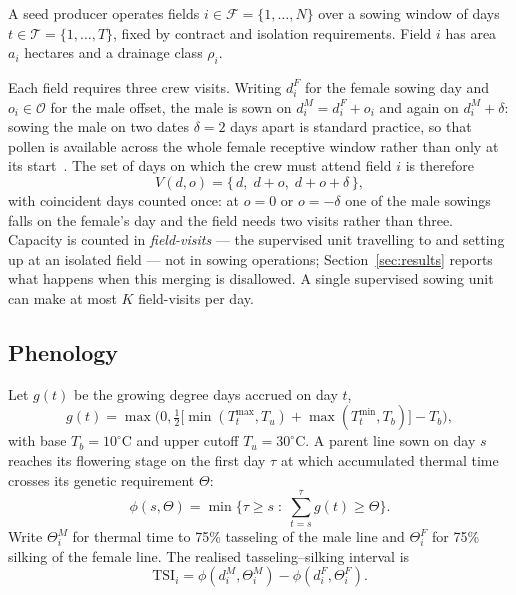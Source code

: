 \documentclass[10pt,twocolumn]{article}
\newcommand{\TSI}{\mathrm{TSI}}
\begin{document}
A seed producer operates fields $i \in \mathcal{F} = \{1,\dots,N\}$ over a
sowing window of days $t \in \mathcal{T} = \{1,\dots,T\}$, fixed by contract
and isolation requirements. Field $i$ has area $a_i$ hectares and a drainage
class $\rho_i$.

Each field requires three crew visits. Writing $d^F_i$ for the female
sowing day and $o_i \in \mathcal{O}$ for the male offset, the male is sown on
$d^M_i = d^F_i + o_i$ and again on $d^M_i + \delta$: sowing the male on two
dates $\delta = 2$ days apart is standard practice, so that pollen is
available across the whole female receptive window rather than only at its
start~\cite{chassaigne2021}. The set of days on which the crew must attend
field $i$ is therefore
\begin{equation}
V(d,o) = \{\, d,\; d+o,\; d+o+\delta \,\},
\label{eq:visits}
\end{equation}
with coincident days counted once: at $o = 0$ or $o = -\delta$ one of the
male sowings falls on the female's day and the field needs two visits
rather than three. Capacity is counted in \emph{field-visits} --- the
supervised unit travelling to and setting up at an isolated field --- not
in sowing operations; Section~\ref{sec:results} reports what happens when
this merging is disallowed. A single supervised sowing unit can make at
most $K$ field-visits per day.

\subsection{Phenology}

Let $g(t)$ be the growing degree days accrued on day $t$,
\begin{equation}
g(t) = \max\!\Big(0, \tfrac{1}{2}\big[\min(T^{\max}_t, T_u)
      + \max(T^{\min}_t, T_b)\big] - T_b\Big),
\end{equation}
with base $T_b = 10^\circ$C and upper cutoff $T_u = 30^\circ$C. A parent
line sown on day $s$ reaches its flowering stage on the first day $\tau$ at
which accumulated thermal time crosses its genetic requirement $\Theta$:
\begin{equation}
\phi(s,\Theta) = \min\Big\{\tau \ge s \;:\; \textstyle\sum_{t=s}^{\tau} g(t) \ge \Theta \Big\}.
\end{equation}
Write $\Theta^M_i$ for thermal time to 75\% tasseling of the male line and
$\Theta^F_i$ for 75\% silking of the female line. The realised
tasseling--silking interval is
\begin{equation}
\TSI_i = \phi(d^M_i, \Theta^M_i) - \phi(d^F_i, \Theta^F_i).
\label{eq:tsi}
\end{equation}
\end{document}
